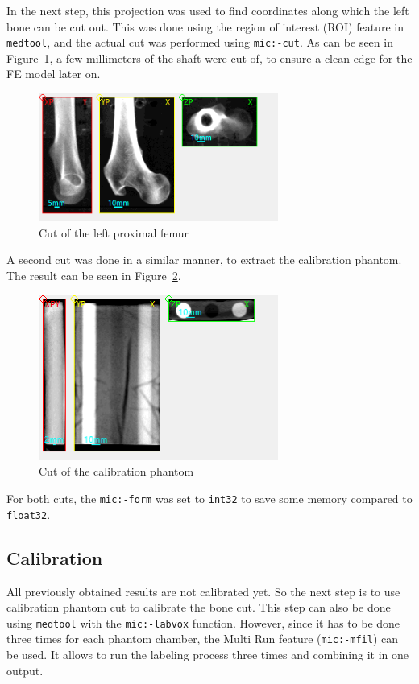 \documentclass[a4paper,12pt]{article}
\begin{document}
    In the next step, this projection was used to find coordinates along which the left bone can be cut out.
    This was done using the region of interest (ROI) feature in \texttt{medtool}, and the actual cut was performed using \texttt{mic:-cut}.
    As can be seen in Figure~\ref{fig:bone_cut}, a few millimeters of the shaft were cut of, to ensure a clean edge for the FE model later on.

    \begin{figure}[htbp]
        \centering
        \includegraphics[width=0.7\textwidth]{bone_cut}
        \caption{Cut of the left proximal femur}
        \label{fig:bone_cut}
    \end{figure}

    A second cut was done in a similar manner, to extract the calibration phantom.
    The result can be seen in Figure~\ref{fig:phantom_cut}.

    \begin{figure}[htbp]
        \centering
        \includegraphics[width=0.7\textwidth]{phantom_cut}
        \caption{Cut of the calibration phantom}
        \label{fig:phantom_cut}
    \end{figure}

    For both cuts, the \texttt{mic:-form} was set to \texttt{int32} to save some memory compared to \texttt{float32}.

    \subsection{Calibration}\label{subsec:calibration}
    All previously obtained results are not calibrated yet.
    So the next step is to use calibration phantom cut to calibrate the bone cut.
    This step can also be done using \texttt{medtool} with the \texttt{mic:-labvox} function.
    However, since it has to be done three times for each phantom chamber, the Multi Run feature (\texttt{mic:-mfil}) can be used.
    It allows to run the labeling process three times and combining it in one output.
\end{document}

